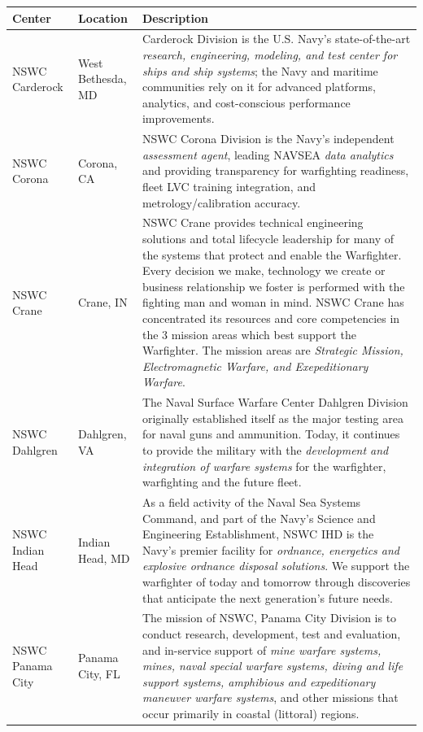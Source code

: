\documentclass[../main.tex]{subfiles}
\begin{document}
\noindent\begin{tabularx}{\textwidth}{@{} >{\RaggedRight\arraybackslash}p{} >{\RaggedRight\arraybackslash}p{} >{\RaggedRight\arraybackslash}X @{}}
  \toprule
  \textbf{Center} & \textbf{Location} & \textbf{Description} \\
  \midrule
  NSWC Carderock & West Bethesda, MD & Carderock Division is the U.S. Navy's state-of-the-art \emph{research, engineering, modeling, and test center for ships and ship systems}; the Navy and maritime communities rely on it for advanced platforms, analytics, and cost-conscious performance improvements. \\
  NSWC Corona & Corona, CA & NSWC Corona Division is the Navy's independent \emph{assessment agent}, leading NAVSEA \emph{data analytics} and providing transparency for warfighting readiness, fleet LVC training integration, and metrology/calibration accuracy. \\
  NSWC Crane & Crane, IN & NSWC Crane provides technical engineering solutions and total lifecycle leadership for many of the systems that protect and enable the Warfighter. Every decision we make, technology we create or business relationship we foster is performed with the fighting man and woman in mind. NSWC Crane has concentrated its resources and core competencies in the 3 mission areas which best support the Warfighter. The mission areas are \emph{Strategic Mission, Electromagnetic Warfare, and Exepeditionary Warfare}. \\
  NSWC Dahlgren & Dahlgren, VA & The Naval Surface Warfare Center Dahlgren Division originally established itself as the major testing area for naval guns and ammunition. Today, it continues to provide the military with the \emph{development and integration of warfare systems} for the warfighter, warfighting and the future fleet. \\
  NSWC Indian Head & Indian Head, MD & As a field activity of the Naval Sea Systems Command, and part of the Navy's Science and Engineering Establishment, NSWC IHD is the Navy's premier facility for \emph{ordnance, energetics and explosive ordnance disposal solutions}. We support the warfighter of today and tomorrow through discoveries that anticipate the next generation's future needs. \\
  NSWC Panama City & Panama City, FL & The mission of NSWC, Panama City Division is to conduct research, development, test and evaluation, and in-service support of \emph{mine warfare systems, mines, naval special warfare systems, diving and life support systems, amphibious and expeditionary maneuver warfare systems}, and other missions that occur primarily in coastal (littoral) regions. \\

\end{tabularx}
\end{document}
